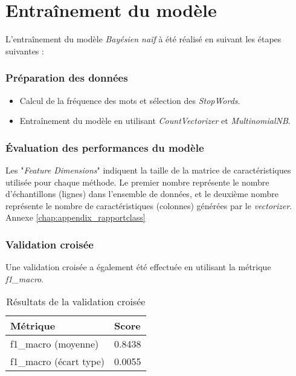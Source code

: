 \section{Entraînement du modèle}

L'entraînement du modèle \textit{Bayésien naïf} à été réalisé en suivant les étapes suivantes :

\subsubsection{Préparation des données}

\begin{itemize}
    \item Calcul de la fréquence des mots et sélection des \textit{StopWords}.
    \item Entraînement du modèle en utilisant \textit{CountVectorizer} et \textit{MultinomialNB}.
\end{itemize}

\subsubsection{Évaluation des performances du modèle}

Les "\textit{Feature Dimensions}" indiquent la taille de la matrice de caractéristiques utilisée pour chaque méthode. Le premier nombre représente le nombre d'échantillons (lignes) dans l'ensemble de données, et le deuxième nombre représente le nombre de caractéristiques (colonnes) générées par le \textit{vectorizer}.
Annexe \ref{chap:appendix_rapportclass}



\subsubsection{Validation croisée}

Une validation croisée a également été effectuée en utilisant la métrique \textit{f1\_macro}.

\begin{table}[h]
    \centering
    \begin{tabular}{|l|l|}
    \hline
    \textbf{Métrique} & \textbf{Score} \\ \hline
    f1\_macro (moyenne) & 0.8438 \\ \hline
    f1\_macro (écart type) & 0.0055 \\ \hline
    \end{tabular}
    \caption{Résultats de la validation croisée}
\end{table}

